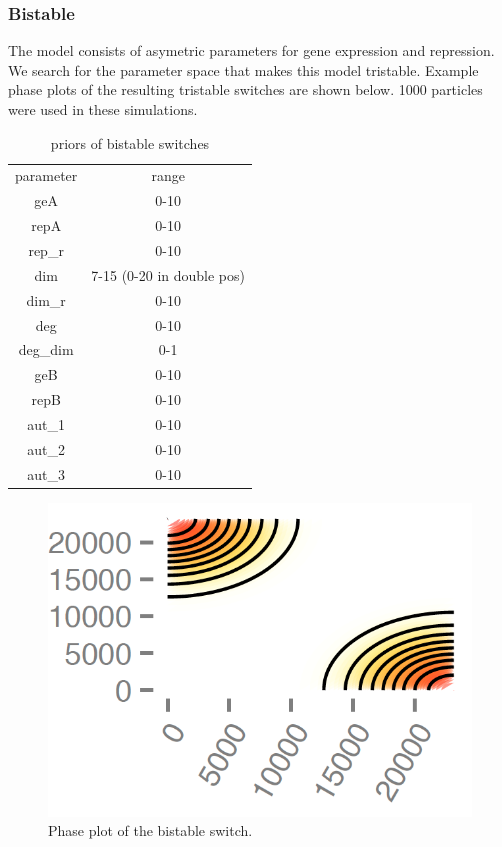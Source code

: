 \subsubsection{Bistable} 
The model consists of asymetric parameters for gene expression and repression. We search for the parameter space that makes this model tristable. Example phase plots of the resulting tristable switches are shown below. 1000 particles were used in these simulations.


\begin{table}[htbp]
\centering
\caption{priors of bistable switches}
\label{tab:priors_bi}
\begin{tabular}{cc}
parameter & range \\
geA & 0-10 \\
repA & 0-10 \\
rep\_r & 0-10 \\
dim & 7-15 (0-20 in double pos)\\
dim\_r & 0-10 \\
deg & 0-10 \\
deg\_dim & 0-1 \\
geB & 0-10 \\
repB & 0-10 \\
aut\_1 & 0-10 \\
aut\_2 & 0-10 \\
aut\_3 & 0-10
\end{tabular}
\end{table}

\begin{figure}[htbp]
\begin{center}
\includegraphics[scale=0.2]{chapterModelling/mass_action_stochastic_switches/bi_stoch_images/phase_plt.png}
\caption{Phase plot of the bistable switch.}\label{fig_5}
\end{center}
\end{figure}

